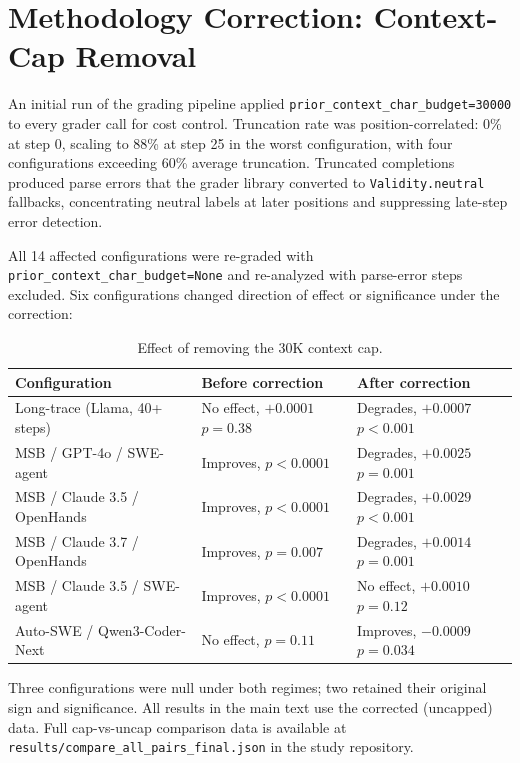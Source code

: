 \documentclass[11pt]{article}
\begin{document}
\section{Methodology Correction: Context-Cap Removal}
\label{app:correction}

An initial run of the grading pipeline applied \texttt{prior\_context\_char\_budget=30000} to every grader call for cost control.
Truncation rate was position-correlated: 0\% at step 0, scaling to 88\% at step 25 in the worst configuration, with four configurations exceeding 60\% average truncation.
Truncated completions produced parse errors that the grader library converted to \texttt{Validity.neutral} fallbacks, concentrating neutral labels at later positions and suppressing late-step error detection.

All 14 affected configurations were re-graded with \texttt{prior\_context\_char\_budget=None} and re-analyzed with parse-error steps excluded.
Six configurations changed direction of effect or significance under the correction:

\begin{table}[h]
\centering
\small
\caption{Effect of removing the 30K context cap.}
\label{tab:correction}
\begin{tabular}{lll}
\toprule
Configuration & Before correction & After correction \\
\midrule
Long-trace (Llama, 40+ steps) & No effect, $+0.0001$ $p{=}0.38$ & Degrades, $+0.0007$ $p{<}0.001$ \\
MSB / GPT-4o / SWE-agent & Improves, $p{<}0.0001$ & Degrades, $+0.0025$ $p{=}0.001$ \\
MSB / Claude 3.5 / OpenHands & Improves, $p{<}0.0001$ & Degrades, $+0.0029$ $p{<}0.001$ \\
MSB / Claude 3.7 / OpenHands & Improves, $p{=}0.007$ & Degrades, $+0.0014$ $p{=}0.001$ \\
MSB / Claude 3.5 / SWE-agent & Improves, $p{<}0.0001$ & No effect, $+0.0010$ $p{=}0.12$ \\
Auto-SWE / Qwen3-Coder-Next & No effect, $p{=}0.11$ & Improves, $-0.0009$ $p{=}0.034$ \\
\bottomrule
\end{tabular}
\end{table}

Three configurations were null under both regimes; two retained their original sign and significance.
All results in the main text use the corrected (uncapped) data.
Full cap-vs-uncap comparison data is available at \texttt{results/compare\_all\_pairs\_final.json} in the study repository.
\end{document}
